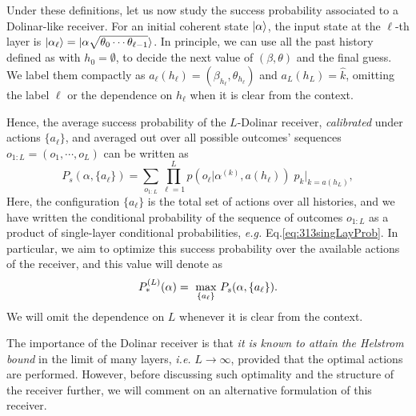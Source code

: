 Under these definitions, let us now study the success probability associated to a Dolinar-like receiver. For an initial coherent state $\ket{\alpha}$, the input state at the $\ell$-th layer is $\ket{\alpha_{\ell}}=\ket{\alpha\sqrt{\theta_{0}\cdots\theta_{\ell-1}}}$. In principle, we can use all the past history defined as
with $h_{0}=\emptyset$, to decide the next value of $(\beta,\theta)$ and the final guess. We label them compactly as $a_\ell(h_{\ell})=(\beta_{h_{\ell}},\theta_{h_{\ell}})$ and $a_{L}(h_{L})=\hat{k}$, omitting the label $\ell$ or the dependence on $h_{\ell}$ when it is clear from the context.

Hence, the average success probability of the $L$-Dolinar receiver, \textit{calibrated} under actions $\{a_\ell\}$, and averaged out over all possible outcomes' sequences $o_{1:L}=(o_{1},\cdots,o_{L})$ can be written as
\begin{equation}\label{eq:psdol}
P_{s}(\alpha,\{a_\ell\})=\sum_{o_{1:L}} \prod_{\ell=1}^{L}p(o_{\ell}|\alpha^{(k)},a(h_{\ell})) \; p_{k}\Big|_{k=a(h_{L})},
\end{equation}
Here, the configuration $\{a_{\ell}\}$ is the total set of actions over all histories, and we have written the conditional probability of the sequence of outcomes $o_{1:L}$ as a product of single-layer conditional probabilities, \textit{e.g.} Eq.\eqref{eq:313singLayProb}. In particular, we aim to optimize this success probability over the available actions of the receiver, and this value will denote as
\begin{equation}\label{eq:32OptSuc}
  P_{*}^{(L)}(\alpha) = \underset{\lbrace a_{\ell}\rbrace}{\text{ max }} P_s(\alpha, \lbrace a_\ell\rbrace).
\end{equation}
We will omit the dependence on $L$ whenever it is clear from the context.

The importance of the Dolinar receiver is that \textit{it is known to attain the Helstrom bound} in the limit of many layers, \textit{i.e.} $L\rightarrow \infty$, provided that the optimal actions are performed. However, before discussing such optimality and the structure of the receiver further, we will comment on an alternative formulation of this receiver.

